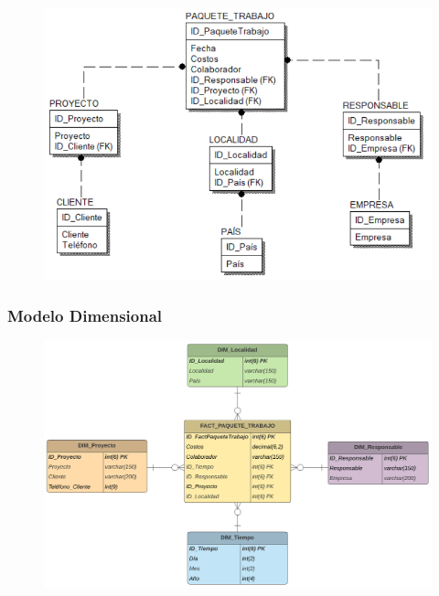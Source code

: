 \documentclass[12pt,letterpaper]{article}
\begin{document}
	\begin{figure}[htb]
		\begin{center}
			\includegraphics[width=12cm]{./Imagenes/mod_fisico_3}
			
		\end{center}
	\end{figure}

\newpage

\subsubsection{\textbf{Modelo Dimensional }}

	\begin{figure}[htb]
		\begin{center}
			\includegraphics[width=14cm]{./Imagenes/mod_dimensional_3}
			
		\end{center}
	\end{figure}
\end{document}
